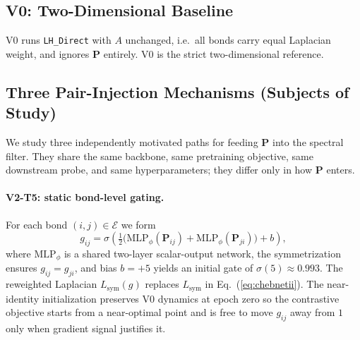 \subsection{V0: Two-Dimensional Baseline}
\label{sec:v0}
V0 runs \texttt{LH\_Direct} with $A$ unchanged, i.e.\ all bonds carry equal
Laplacian weight, and ignores $\mathbf{P}$ entirely. V0 is the strict
two-dimensional reference.

\subsection{Three Pair-Injection Mechanisms (Subjects of Study)}
\label{sec:subjects}
We study three independently motivated paths for feeding $\mathbf{P}$ into
the spectral filter. They share the same backbone, same pretraining
objective, same downstream probe, and same hyperparameters; they differ
only in how $\mathbf{P}$ enters.

\paragraph{V2-T5: static bond-level gating.}
\label{sec:v2t5}
For each bond $(i,j)\in\mathcal{E}$ we form
\begin{equation}
    g_{ij} = \sigma\!\left( \tfrac{1}{2}\bigl(\mathrm{MLP}_\phi(\mathbf{P}_{ij}) + \mathrm{MLP}_\phi(\mathbf{P}_{ji})\bigr) + b \right),
    \label{eq:v2t5gate}
\end{equation}
where $\mathrm{MLP}_\phi$ is a shared two-layer scalar-output network, the
symmetrization ensures $g_{ij}=g_{ji}$, and bias $b{=}{+}5$ yields an
initial gate of $\sigma(5)\approx 0.993$. The reweighted Laplacian
$L_{\mathrm{sym}}(g)$ replaces $L_{\mathrm{sym}}$ in
Eq.~(\ref{eq:chebnetii}). The near-identity initialization preserves V0
dynamics at epoch zero so the contrastive objective starts from a
near-optimal point and is free to move $g_{ij}$ away from $1$ only when
gradient signal justifies it.


